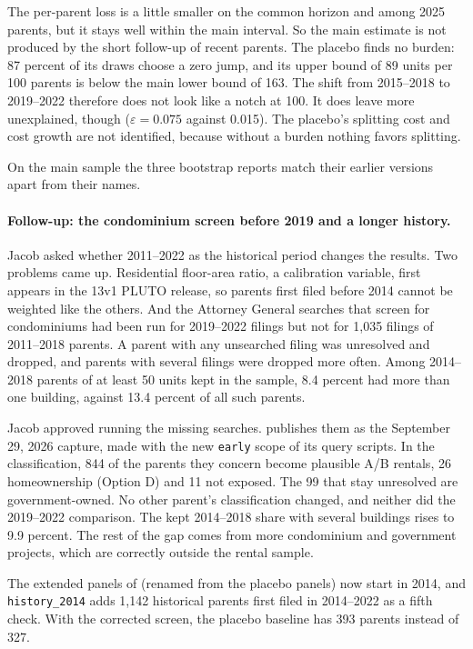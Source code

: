 The per-parent loss is a little smaller on the common horizon and among 2025
parents, but it stays well within the main interval. So the main estimate is
not produced by the short follow-up of recent parents. The placebo finds no
burden: 87 percent of its draws choose a zero jump, and its upper bound of 89
units per 100 parents is below the main lower bound of 163. The shift from
2015--2018 to 2019--2022 therefore does not look like a notch at 100. It does
leave more unexplained, though ($\varepsilon = 0.075$ against 0.015). The
placebo's splitting cost and cost growth are not identified, because without a
burden nothing favors splitting.

On the main sample the three bootstrap reports match their earlier versions
apart from their names.

\paragraph{Follow-up: the condominium screen before 2019 and a longer history.}
Jacob asked whether 2011--2022 as the historical period changes the results.
Two problems came up. Residential floor-area ratio, a calibration variable,
first appears in the 13v1 PLUTO release, so parents first filed before 2014
cannot be weighted like the others. And the Attorney General searches that
screen for condominiums had been run for 2019--2022 filings but not for 1,035
filings of 2011--2018 parents. A parent with any unsearched filing was
unresolved and dropped, and parents with several filings were dropped more
often. Among 2014--2018 parents of at least 50 units kept in the sample, 8.4
percent had more than one building, against 13.4 percent of all such parents.

Jacob approved running the missing searches. 
publishes them as the September 29, 2026 capture, made with the new
\texttt{early} scope of its query scripts. In the classification, 844 of the
parents they concern become plausible A/B rentals, 26 homeownership (Option D)
and 11 not exposed. The 99 that stay unresolved are government-owned. No other
parent's classification changed, and neither did the 2019--2022 comparison.
The kept 2014--2018 share with several buildings rises to 9.9 percent. The rest
of the gap comes from more condominium and government projects, which are
correctly outside the rental sample.

The extended panels of  (renamed from the placebo
panels) now start in 2014, and \texttt{history\_2014} adds 1,142 historical
parents first filed in 2014--2022 as a fifth check. With the corrected screen,
the placebo baseline has 393 parents instead of 327.

